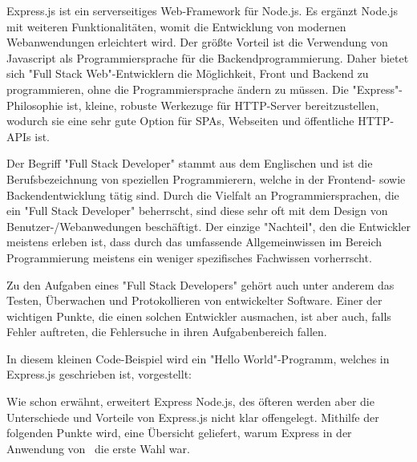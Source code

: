  \label{sec:express}

Express.js ist ein serverseitiges Web-Framework für Node.js. Es ergänzt Node.js mit weiteren Funktionalitäten, womit die Entwicklung von modernen Webanwendungen erleichtert wird. Der größte Vorteil ist die Verwendung von Javascript als Programmiersprache für die Backendprogrammierung. Daher bietet sich "Full Stack Web"-Entwicklern die Möglichkeit, Front und Backend zu programmieren, ohne die Programmiersprache ändern zu müssen. Die "Express"-Philosophie ist, kleine, robuste Werkezuge für HTTP-Server bereitzustellen, wodurch sie eine sehr gute Option für SPAs, Webseiten und öffentliche HTTP-APIs ist. \cite{Express}

Der Begriff "Full Stack Developer" stammt aus dem Englischen und ist die Berufsbezeichnung von speziellen Programmierern, welche in der Frontend- sowie Backendentwicklung tätig sind. Durch die Vielfalt an Programmiersprachen, die ein "Full Stack Developer" beherrscht, sind diese sehr oft mit dem Design von Benutzer-/Webanwedungen beschäftigt. Der einzige "Nachteil", den die Entwickler meistens erleben ist, dass durch das umfassende Allgemeinwissen im Bereich Programmierung meistens ein weniger spezifisches Fachwissen vorherrscht. 

Zu den Aufgaben eines "Full Stack Developers" gehört auch unter anderem das Testen, Überwachen und Protokollieren von entwickelter Software. Einer der wichtigen Punkte, die einen solchen Entwickler ausmachen, ist aber auch, falls Fehler auftreten, die Fehlersuche in ihren Aufgabenbereich fallen. \cite{FullStack}

\pagebreak
{}

In diesem kleinen Code-Beispiel wird ein "Hello World"-Programm, welches in Express.js geschrieben ist, vorgestellt:


\cite{Express}


Wie schon erwähnt, erweitert Express Node.js, des öfteren werden aber die Unterschiede und Vorteile von Express.js nicht klar offengelegt. Mithilfe der folgenden Punkte wird, eine Übersicht geliefert, warum Express in der Anwendung von \ZELIA\ die erste Wahl war.

